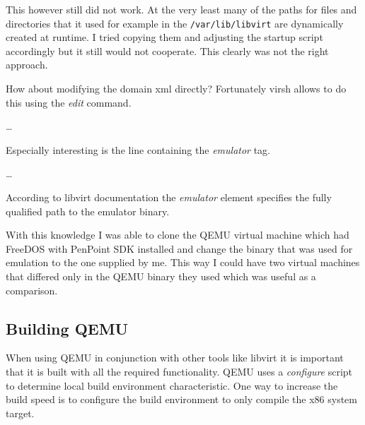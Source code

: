 This however still did not work.  At the very least many of the paths for files
and directories that it used for example in the \lstinline{/var/lib/libvirt} are
dynamically created at runtime.  I tried copying them and adjusting the startup
script accordingly but it still would not cooperate.  This clearly was not the
right approach.

How about modifying the domain xml directly?  Fortunately virsh allows to do
this using the \emph{edit} command.

\begin{codeblock}
    

    \dots

    
\end{codeblock}

\noindent
Especially interesting is the line containing the \emph{emulator} tag.

\begin{codeblock}
    
    
    \dots

    
\end{codeblock}

\noindent
According to libvirt documentation \cite{libvirt} the \emph{emulator} element
specifies the fully qualified path to the emulator binary.

With this knowledge I was able to clone the QEMU virtual machine which had
FreeDOS with PenPoint SDK installed and change the binary that was used for
emulation to the one supplied by me.  This way I could have two virtual machines
that differed only in the QEMU binary they used which was useful as
a comparison.

\subsection{Building QEMU} %


When using QEMU in conjunction with other tools like libvirt it is important
that it is built with all the required functionality.  QEMU uses
a \emph{configure} script to determine local build environment characteristic.
One way to increase the build speed is to configure the build environment to
only compile the x86 system target.

